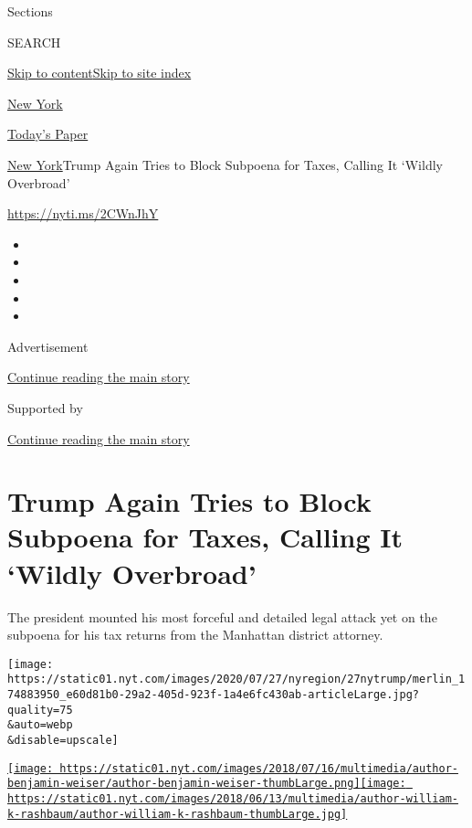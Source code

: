 Sections

SEARCH

\protect\hyperlink{site-content}{Skip to
content}\protect\hyperlink{site-index}{Skip to site index}

\href{https://www.nytimes.com/section/nyregion}{New York}

\href{https://myaccount.nytimes.com/auth/login?response_type=cookie\&client_id=vi}{}

\href{https://www.nytimes.com/section/todayspaper}{Today's Paper}

\href{/section/nyregion}{New York}\textbar{}Trump Again Tries to Block
Subpoena for Taxes, Calling It `Wildly Overbroad'

\url{https://nyti.ms/2CWnJhY}

\begin{itemize}
\item
\item
\item
\item
\item
\end{itemize}

Advertisement

\protect\hyperlink{after-top}{Continue reading the main story}

Supported by

\protect\hyperlink{after-sponsor}{Continue reading the main story}

\hypertarget{trump-again-tries-to-block-subpoena-for-taxes-calling-it-wildly-overbroad}{%
\section{Trump Again Tries to Block Subpoena for Taxes, Calling It
`Wildly
Overbroad'}\label{trump-again-tries-to-block-subpoena-for-taxes-calling-it-wildly-overbroad}}

The president mounted his most forceful and detailed legal attack yet on
the subpoena for his tax returns from the Manhattan district attorney.

\texttt{[image: https://static01.nyt.com/images/2020/07/27/nyregion/27nytrump/merlin\_174883950\_e60d81b0-29a2-405d-923f-1a4e6fc430ab-articleLarge.jpg?quality=75\\\&auto=webp\\\&disable=upscale]}

\href{https://www.nytimes.com/by/benjamin-weiser}{\texttt{[image: https://static01.nyt.com/images/2018/07/16/multimedia/author-benjamin-weiser/author-benjamin-weiser-thumbLarge.png]}}\href{https://www.nytimes.com/by/william-k-rashbaum}{\texttt{[image: https://static01.nyt.com/images/2018/06/13/multimedia/author-william-k-rashbaum/author-william-k-rashbaum-thumbLarge.jpg]}}

